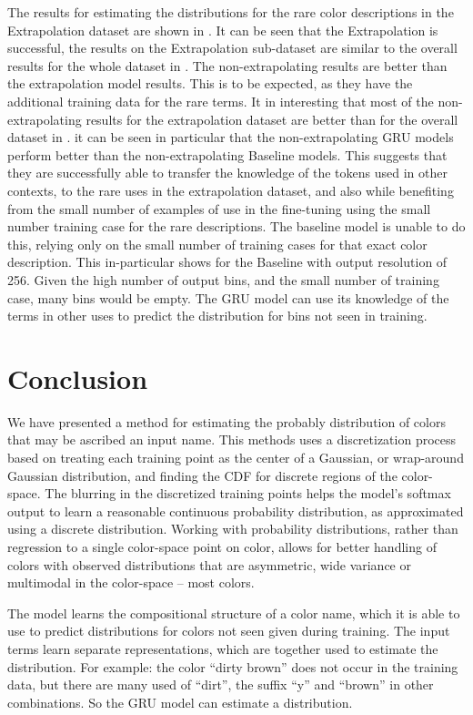 \documentclass[11pt,letterpaper]{article}
\begin{document}
The results for estimating the distributions for the rare color descriptions in the Extrapolation dataset are shown in .
It can be seen that the Extrapolation is successful, the results on the Extrapolation sub-dataset are similar to the overall results for the whole dataset in .
The non-extrapolating results are better than the extrapolation model results.
This is to be expected, as they have the additional training data for the rare terms.
It in interesting that most of the non-extrapolating results for the extrapolation dataset are better than for the overall dataset in .
it can be seen in particular that the non-extrapolating GRU models perform better than the non-extrapolating Baseline models.
This suggests that they are successfully able to transfer the knowledge of the tokens used in other contexts, to the rare uses in the extrapolation dataset, and also while benefiting from the small number of examples of use in the fine-tuning using the small number training case for the rare descriptions.
The baseline model is unable to do this, relying only on the small number of training cases for that exact color description.
This in-particular shows for the Baseline with output resolution of 256.
Given the high number of output bins, and the small number of training case, many bins would be empty.
The GRU model can use its knowledge of the terms in other uses to predict the distribution for bins not seen in training.




\section{Conclusion}
We have presented a method for estimating the probably distribution of colors that may be ascribed an input name.
This methods uses a discretization process based on treating each training point as the center of a Gaussian, or wrap-around Gaussian distribution, and finding the CDF for discrete regions of the color-space.
The blurring in the discretized training points helps the model's softmax output to learn a reasonable continuous probability distribution, as approximated using a discrete distribution.
Working with probability distributions, rather than regression to a single color-space point on color, allows for better handling of colors with observed distributions that are asymmetric, wide variance or multimodal in the color-space -- most colors.

The model learns the compositional structure of a color name, which it is able to use to predict distributions for colors not seen given during training.
The input terms learn separate representations, which are together used to estimate the distribution.
For example: the color ``dirty brown'' does not occur in the training data, but there are many used of ``dirt'', the suffix ``y'' and ``brown'' in other combinations.
So the GRU model can estimate a distribution.
\end{document}
